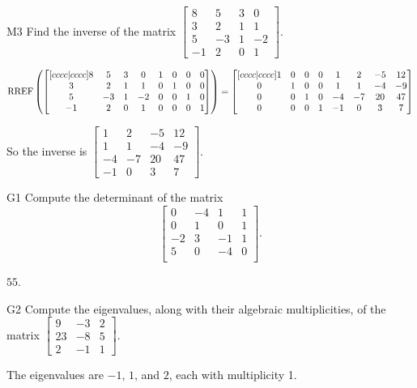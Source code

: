 \documentclass{sbgLAsemi}
\begin{document}
\begin{problem}{M3}
Find the inverse of the matrix $\begin{bmatrix} 8 & 5 & 3 & 0 \\ 3 & 2 & 1 & 1 \\ 5 & -3 & 1 & -2 \\ -1 & 2 & 0 & 1\end{bmatrix} $.
\end{problem}
\begin{solution}
$$\operatorname{RREF} \left(\begin{bmatrix}[cccc|cccc] 8 & 5 & 3 & 0 & 1 & 0 & 0 & 0\\ 3 & 2 & 1 & 1 & 0 & 1 & 0 & 0 \\ 5 & -3 & 1 & -2 & 0 & 0 & 1 & 0 \\ -1 & 2 & 0 & 1 & 0 & 0 & 0 & 1 \end{bmatrix} \right) = \begin{bmatrix}[cccc|cccc] 1 & 0 & 0 & 0 & 1 & 2 & -5 & 12 \\ 0 &  1 & 0 & 0 & 1 & 1 & -4 & -9 \\ 0 & 0 & 1 & 0 & -4 & -7 & 20 & 47 \\ 0 & 0 & 0 & 1 & -1 & 0 & 3 & 7 \end{bmatrix}$$

So the inverse is $\begin{bmatrix} 1 & 2 & -5 & 12 \\  1 & 1 & -4 & -9 \\  -4 & -7 & 20 & 47 \\-1 & 0 & 3 & 7 \end{bmatrix}$.
\end{solution}


\begin{problem}{G1}
Compute the determinant of the matrix
\[
  \begin{bmatrix}
    0 & -4 & 1 & 1 \\
    0 & 1 & 0 & 1 \\
    -2 & 3 & -1 & 1 \\
    5 & 0 & -4 & 0 \\
  \end{bmatrix}
.\]
\end{problem}
\begin{solution}
\(55\).
\end{solution}

\begin{problem}{G2} 
Compute the eigenvalues, along with their algebraic multiplicities, of the matrix $ \begin{bmatrix} 9 & -3 & 2 \\ 23 & -8 & 5 \\  2 & -1 & 1 \end{bmatrix}$.
\end{problem}
\begin{solution}
The eigenvalues are $-1$, $1$, and $2$, each with multiplicity 1.
\end{solution}
\end{document}
